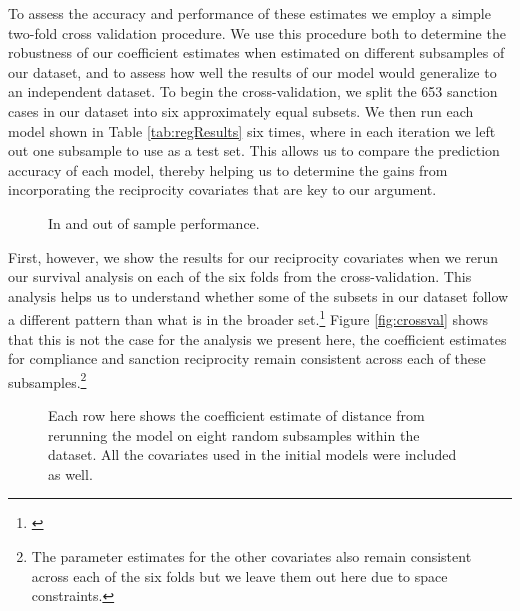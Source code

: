 To assess the accuracy and performance of these estimates we employ a simple two-fold cross validation procedure. We use this procedure both to determine the robustness of our coefficient estimates when estimated on different subsamples of our dataset, and to assess how well the results of our model would generalize to an independent dataset. To begin the cross-validation, we split the 653 sanction cases in our dataset into six approximately equal subsets. We then run each model shown in Table \ref{tab:regResults} six times, where in each iteration we left out one subsample to use as a test set. This allows us to compare the prediction accuracy of each model, thereby helping us to determine the gains from incorporating the reciprocity covariates that are key to our argument.

\begin{figure}
	\centering
	\resizebox{.8\textwidth}{!}{}
	\caption{In and out of sample performance.}
	\label{fig:rmsePlot}
\end{figure}

First, however, we show the results for our reciprocity covariates when we rerun our survival analysis on each of the six folds from the cross-validation. This analysis helps us to understand whether some of the subsets in our dataset follow a different pattern than what is in the broader set.\footnote{\cite{beck2008time}} Figure \ref{fig:crossval} shows that this is not the case for the analysis we present here, the coefficient estimates for compliance and sanction reciprocity remain consistent across each of these subsamples.\footnote{The parameter estimates for the other covariates also remain consistent across each of the six folds but we leave them out here due to space constraints.}

\begin{figure}
	\centering
	\resizebox{.8\textwidth}{!}{}
	\caption{Each row here shows the coefficient estimate of distance from rerunning the model on eight random subsamples within the dataset. All the covariates used in the initial models were included as well.}
	\label{fig:crossPlot}
\end{figure}